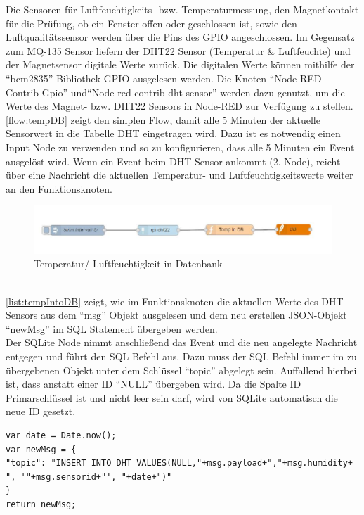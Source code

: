Die Sensoren für Luftfeuchtigkeits- bzw. Temperaturmessung, den Magnetkontakt für die Prüfung, ob ein Fenster offen oder geschlossen ist, sowie den Luftqualitätssensor werden über die Pins des \ac{GPIO} angeschlossen. Im Gegensatz zum MQ-135 Sensor liefern der DHT22 Sensor (Temperatur \& Luftfeuchte) und der Magnetsensor digitale Werte zurück. Die digitalen Werte können mithilfe der \enquote{bcm2835}-Bibliothek \ac{GPIO} ausgelesen werden\cite{bcm:Bcm}. Die Knoten \enquote{Node-RED-Contrib-Gpio}\cite{node:GPIO} und\enquote{Node-red-contrib-dht-sensor}\cite{node:DHT22} werden dazu genutzt, um die Werte des Magnet- bzw. DHT22 Sensors in Node-RED zur Verfügung zu stellen. 
\\
\autoref{flow:tempDB} zeigt den simplen Flow, damit alle 5 Minuten der aktuelle Sensorwert in die Tabelle DHT eingetragen wird. Dazu ist es notwendig einen Input Node zu verwenden und so zu konfigurieren, dass alle 5 Minuten ein Event ausgelöst wird. Wenn ein Event beim DHT Sensor ankommt (2. Node), reicht über eine Nachricht die aktuellen Temperatur- und Luftfeuchtigkeitswerte weiter an den Funktionsknoten.
\begin{figure}[h]
	\centering
	\includegraphics[scale=0.7]{images/tempIntoDB}
	\caption{Temperatur/ Luftfeuchtigkeit in Datenbank}
	\label{flow:tempDB}
\end{figure}
\\\autoref{list:tempIntoDB} zeigt, wie im Funktionsknoten die aktuellen Werte des DHT Sensors aus dem \enquote{msg} Objekt ausgelesen und dem neu erstellen \ac{JSON}-Objekt \enquote{newMsg} im \ac{SQL} Statement übergeben werden. \\Der SQLite Node nimmt anschließend das Event und die neu angelegte Nachricht entgegen und führt den \ac{SQL} Befehl  aus. Dazu muss der \ac{SQL} Befehl immer im zu übergebenen Objekt unter dem Schlüssel \enquote{topic} abgelegt sein. Auffallend hierbei ist, dass anstatt einer ID \enquote{NULL} übergeben wird. Da die Spalte ID Primarschlüssel ist und nicht leer sein darf, wird von SQLite automatisch die neue ID gesetzt.
\begin{lstlisting}[label=list:tempIntoDB, caption={Neuer Eintrag in Tabelle DHT}]
var date = Date.now();
var newMsg = {
"topic": "INSERT INTO DHT VALUES(NULL,"+msg.payload+","+msg.humidity+ ", '"+msg.sensorid+"', "+date+")"
}
return newMsg;
\end{lstlisting}
